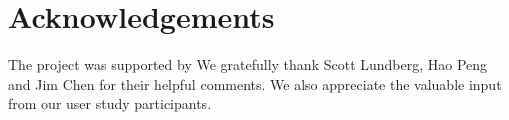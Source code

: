 \section*{Acknowledgements}
The project was supported by 
We gratefully thank Scott Lundberg, Hao Peng and Jim Chen for their helpful comments.
We also appreciate the valuable input from our user study participants.